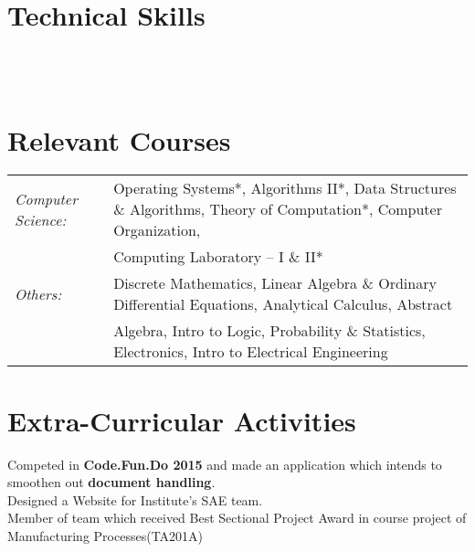 \documentclass[a4paper]{norm-resume}
\begin{document}

\section{Technical Skills \hrulefill}

 \hfill {} \\
 \hfill {} \\
 \hfill {}


\section{Relevant Courses \hrulefill}
	
	\begin{tabular}{lp{19cm}}

	\normalsize\emph{Computer Science:} & \small{Operating Systems*, Algorithms II*, Data Structures \& Algorithms, Theory of Computation*, Computer Organization,} \\
	& \small{Computing Laboratory – I \& II*} \\
	\normalsize\emph{Others:} & \small{Discrete Mathematics, Linear Algebra \& Ordinary Differential Equations, Analytical Calculus, Abstract} \\
	& \small{Algebra, Intro to Logic, Probability \& Statistics, Electronics, Intro to Electrical Engineering}
	\end{tabular}

\section{Extra-Curricular Activities \hrulefill}
    Competed in \textbf{Code.Fun.Do 2015} and made an application which intends to smoothen out \textbf{document handling}. \\
    Designed a Website for Institute’s SAE team. \\
    Member of team which received Best Sectional Project Award in course project of Manufacturing Processes(TA201A)
\end{document}
